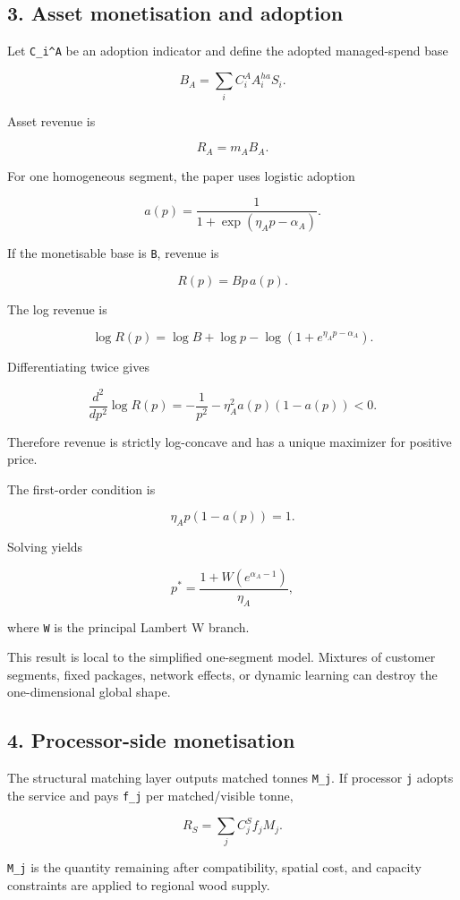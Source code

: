 \subsection{3. Asset monetisation and adoption}\label{asset-monetisation-and-adoption}

Let \texttt{C\_i\^{}A} be an adoption indicator and define the adopted managed-spend base

\[
B_A=\sum_i C_i^A A_i^{ha}S_i.
\]

Asset revenue is

\[
R_A=m_A B_A.
\]

For one homogeneous segment, the paper uses logistic adoption

\[
a(p)=\frac{1}{1+\exp(\eta_Ap-\alpha_A)}.
\]

If the monetisable base is \texttt{B}, revenue is

\[
R(p)=Bp\,a(p).
\]

The log revenue is

\[
\log R(p)=\log B+\log p-\log(1+e^{\eta_Ap-\alpha_A}).
\]

Differentiating twice gives

\[
\frac{d^2}{dp^2}\log R(p)
=-\frac1{p^2}-\eta_A^2a(p)(1-a(p))<0.
\]

Therefore revenue is strictly log-concave and has a unique maximizer for
positive price.

The first-order condition is

\[
\eta_Ap(1-a(p))=1.
\]

Solving yields

\[
p^*=\frac{1+W(e^{\alpha_A-1})}{\eta_A},
\]

where \texttt{W} is the principal Lambert W branch.

This result is local to the simplified one-segment model. Mixtures of customer
segments, fixed packages, network effects, or dynamic learning can destroy the
one-dimensional global shape.

\subsection{4. Processor-side monetisation}\label{processor-side-monetisation}

The structural matching layer outputs matched tonnes \texttt{M\_j}. If processor \texttt{j}
adopts the service and pays \texttt{f\_j} per matched/visible tonne,

\[
R_S=\sum_j C_j^S f_j M_j.
\]

\texttt{M\_j} is the quantity remaining after compatibility, spatial cost, and capacity
constraints are applied to regional wood supply.

